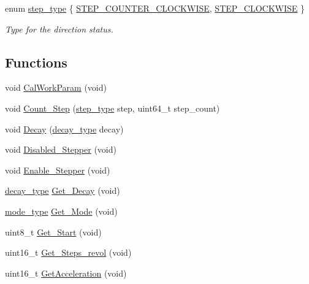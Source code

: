 \begin{DoxyCompactItemize}
enum \hyperlink{group__DRV8825_ga3af682b92aa259509aea217f6dc64356}{step\-\_\-type} \{ \hyperlink{group__DRV8825_gga3af682b92aa259509aea217f6dc64356a05e804aea3cc6dd53f5d5a836d0365c9}{S\-T\-E\-P\-\_\-\-C\-O\-U\-N\-T\-E\-R\-\_\-\-C\-L\-O\-C\-K\-W\-I\-S\-E}, 
\hyperlink{group__DRV8825_gga3af682b92aa259509aea217f6dc64356aafe6025725d6001f0b0a973f1e719cc4}{S\-T\-E\-P\-\_\-\-C\-L\-O\-C\-K\-W\-I\-S\-E}
 \}
\begin{DoxyCompactList}\small\item\em Type for the direction status. \end{DoxyCompactList}\end{DoxyCompactItemize}
\subsection*{Functions}
\begin{DoxyCompactItemize}
\item 
void \hyperlink{group__DRV8825_ga3389079a7106f1e741c0bc447dfbcbca}{Cal\-Work\-Param} (void)
\item 
void \hyperlink{group__DRV8825_ga961e1c89176d3c56101bb4eddf6642dc}{Count\-\_\-\-Step} (\hyperlink{group__DRV8825_ga3af682b92aa259509aea217f6dc64356}{step\-\_\-type} step, uint64\-\_\-t step\-\_\-count)
\item 
void \hyperlink{group__DRV8825_gade0e100f335652e364c58ae4a5c89ba4}{Decay} (\hyperlink{group__DRV8825_gafe05744bd777532cf059c0d7293a7ab8}{decay\-\_\-type} decay)
\item 
void \hyperlink{group__DRV8825_ga5b763d9479149e1cd8843fa5f144a18a}{Disabled\-\_\-\-Stepper} (void)
\item 
void \hyperlink{group__DRV8825_gab1ea57d26402b13aaed719a4d11097d5}{Enable\-\_\-\-Stepper} (void)
\item 
\hyperlink{group__DRV8825_gafe05744bd777532cf059c0d7293a7ab8}{decay\-\_\-type} \hyperlink{group__DRV8825_ga20503ca831d18cf625abe0f6e98d281a}{Get\-\_\-\-Decay} (void)
\item 
\hyperlink{group__DRV8825_ga19269c193c0c4866cdc4e5abd433f9fc}{mode\-\_\-type} \hyperlink{group__DRV8825_ga51c375fddbfeaed5366cd0bf2f9a2dab}{Get\-\_\-\-Mode} (void)
\item 
uint8\-\_\-t \hyperlink{group__DRV8825_gabdfa1389f4c68fca40077275f7727fea}{Get\-\_\-\-Start} (void)
\item 
uint16\-\_\-t \hyperlink{group__DRV8825_ga5591760e7dd32c026ec449f0d516af28}{Get\-\_\-\-Steps\-\_\-revol} (void)
\item 
uint16\-\_\-t \hyperlink{group__DRV8825_ga6202c4fd41a45376809e5940428467b9}{Get\-Acceleration} (void)

\end{DoxyCompactItemize}
